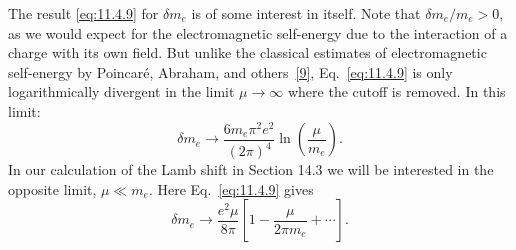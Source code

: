 The result \eqref{eq:11.4.9} for $\delta m_e$ is of some interest in itself. Note that
$\delta m_e/m_e>0$, as we would expect for the electromagnetic self-energy due
to the interaction of a charge with its own field. But unlike the classical
estimates of electromagnetic self-energy by Poincar\'e, Abraham, and others~\hyperref[ref:11.9]{[9]},
Eq.~\eqref{eq:11.4.9} is only logarithmically divergent in the limit $\mu\to\infty$
where the cutoff is removed. In this limit:
\begin{equation}
\delta m_e\to\frac{6m_e\pi^2e^2}{(2\pi)^4}\ln\left(\frac{\mu}{m_e}\right).
\tag{11.4.15}\label{eq:11.4.15}
\end{equation}
In our calculation of the Lamb shift in Section 14.3 we will be interested in
the opposite limit, $\mu\ll m_e$. Here Eq.~\eqref{eq:11.4.9} gives
\begin{equation}
\delta m_e\to\frac{e^2\mu}{8\pi}
\left[1-\frac{\mu}{2\pi m_e}+\cdots\right].
\tag{11.4.16}\label{eq:11.4.16}
\end{equation}
